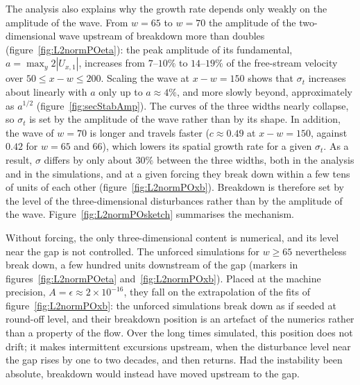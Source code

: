 \documentclass[lineno]{jfm}
\begin{document}
The analysis also explains why the growth rate depends only weakly on the amplitude of the wave. From $w=65$ to $w=70$ the amplitude of the two-dimensional wave upstream of breakdown more than doubles (figure~\ref{fig:L2normPOeta}): the peak amplitude of its fundamental, $a=\max_y 2|U_{x,1}|$, increases from $7$--$10\%$ to $14$--$19\%$ of the free-stream velocity over $50\leq x-w\leq200$. Scaling the wave at $x-w=150$ shows that $\sigma_t$ increases about linearly with $a$ only up to $a\approx4\%$, and more slowly beyond, approximately as $a^{1/2}$ (figure~\ref{fig:secStabAmp}). The curves of the three widths nearly collapse, so $\sigma_t$ is set by the amplitude of the wave rather than by its shape. In addition, the wave of $w=70$ is longer and travels faster ($c\approx0.49$ at $x-w=150$, against $0.42$ for $w=65$ and $66$), which lowers its spatial growth rate for a given $\sigma_t$. As a result, $\sigma$ differs by only about $30\%$ between the three widths, both in the analysis and in the simulations, and at a given forcing they break down within a few tens of units of each other (figure~\ref{fig:L2normPOxb}). Breakdown is therefore set by the level of the three-dimensional disturbances rather than by the amplitude of the wave. Figure~\ref{fig:L2normPOsketch} summarises the mechanism.

Without forcing, the only three-dimensional content is numerical, and its level near the gap is not controlled. The unforced simulations for $w\geq65$ nevertheless break down, a few hundred units downstream of the gap (markers in figures~\ref{fig:L2normPOeta} and~\ref{fig:L2normPOxb}). Placed at the machine precision, $A=\epsilon\approx2\times10^{-16}$, they fall on the extrapolation of the fits of figure~\ref{fig:L2normPOxb}: the unforced simulations break down as if seeded at round-off level, and their breakdown position is an artefact of the numerics rather than a property of the flow. Over the long times simulated, this position does not drift; it makes intermittent excursions upstream, when the disturbance level near the gap rises by one to two decades, and then returns. Had the instability been absolute, breakdown would instead have moved upstream to the gap.
\end{document}
